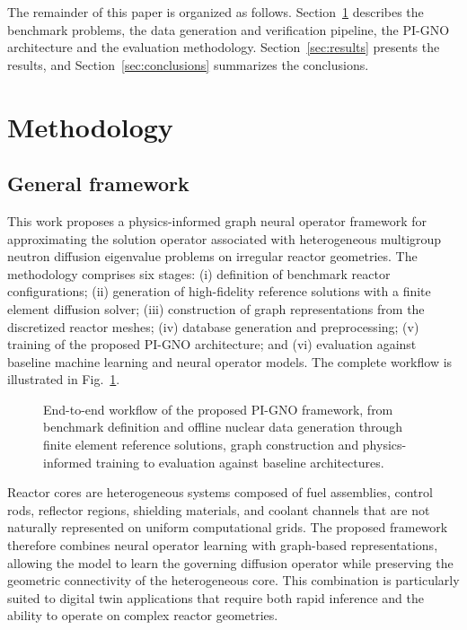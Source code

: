 \documentclass[preprint,12pt]{elsarticle}
\begin{document}
The remainder of this paper is organized as follows. Section~\ref{sec:method}
describes the benchmark problems, the data generation and verification
pipeline, the PI-GNO architecture and the evaluation methodology.
Section~\ref{sec:results} presents the results, and Section~\ref{sec:conclusions}
summarizes the conclusions.

\section{Methodology}
\label{sec:method}

\subsection{General framework}
\label{sec:framework}

This work proposes a physics-informed graph neural operator framework for
approximating the solution operator associated with heterogeneous multigroup
neutron diffusion eigenvalue problems on irregular reactor geometries. The
methodology comprises six stages: (i) definition of benchmark reactor
configurations; (ii) generation of high-fidelity reference solutions with a
finite element diffusion solver; (iii) construction of graph representations
from the discretized reactor meshes; (iv) database generation and
preprocessing; (v) training of the proposed PI-GNO architecture; and
(vi) evaluation against baseline machine learning and neural operator models.
The complete workflow is illustrated in Fig.~\ref{fig:workflow}.

\begin{figure}[htbp]
\centering
\caption{End-to-end workflow of the proposed PI-GNO framework, from benchmark
definition and offline nuclear data generation through finite element
reference solutions, graph construction and physics-informed training to
evaluation against baseline architectures.}
\label{fig:workflow}
\end{figure}

Reactor cores are heterogeneous systems composed of fuel assemblies, control
rods, reflector regions, shielding materials, and coolant channels that are not
naturally represented on uniform computational grids. The proposed framework
therefore combines neural operator learning with graph-based representations,
allowing the model to learn the governing diffusion operator while preserving
the geometric connectivity of the heterogeneous core. This combination is
particularly suited to digital twin applications that require both rapid
inference and the ability to operate on complex reactor geometries.
\end{document}
